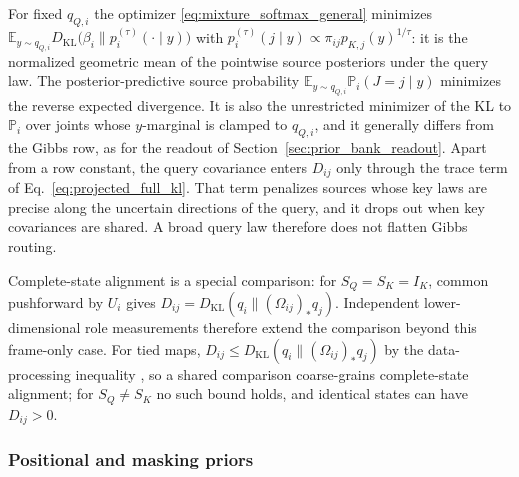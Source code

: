 \documentclass[twoside,11pt]{article}
\begin{document}
For fixed $q_{Q,i}$ the optimizer \eqref{eq:mixture_softmax_general} minimizes $\mathbb E_{y\sim q_{Q,i}}D_{\mathrm{KL}}\bigl(\beta_i\|p_i^{(\tau)}(\cdot\mid y)\bigr)$ with $p_i^{(\tau)}(j\mid y)\propto\pi_{ij}p_{K,j}(y)^{1/\tau}$: it is the normalized geometric mean of the pointwise source posteriors under the query law. The posterior-predictive source probability $\mathbb E_{y\sim q_{Q,i}}\mathbb P_i(J=j\mid y)$ minimizes the reverse expected divergence. It is also the unrestricted minimizer of the KL to $\mathbb P_i$ over joints whose $y$-marginal is clamped to $q_{Q,i}$, and it generally differs from the Gibbs row, as for the readout of Section~\ref{sec:prior_bank_readout}. Apart from a row constant, the query covariance enters $D_{ij}$ only through the trace term of Eq.~\eqref{eq:projected_full_kl}. That term penalizes sources whose key laws are precise along the uncertain directions of the query, and it drops out when key covariances are shared. A broad query law therefore does not flatten Gibbs routing.

Complete-state alignment is a special comparison: for $S_Q=S_K=I_K$, common pushforward by $U_i$ gives
$D_{ij}=D_{\mathrm{KL}}(q_i\|(\Omega_{ij})_*q_j)$.
Independent lower-dimensional role measurements therefore extend the comparison beyond this frame-only case. For tied maps, $D_{ij}\le D_{\mathrm{KL}}(q_i\|(\Omega_{ij})_*q_j)$ by the data-processing inequality \citep[Thm.~9]{vanErvenHarremoes2014}, so a shared comparison coarse-grains complete-state alignment; for $S_Q\ne S_K$ no such bound holds, and identical states can have $D_{ij}>0$.

\subsubsection{Positional and masking priors}
\label{sec:nonuniform_priors}
\end{document}
